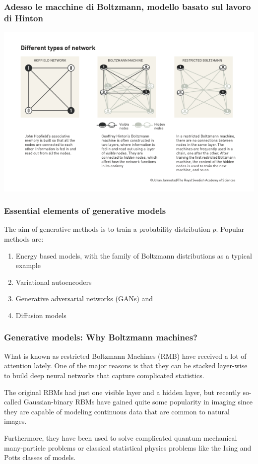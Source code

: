 \documentclass{beamer}
\begin{document}
\begin{frame}
\frametitle{Adesso le macchine di Boltzmann, modello basato sul lavoro di Hinton}

\vspace{6mm}

\centerline{\includegraphics[width=1.0\linewidth]{figures/boltzmannnobel.png}}

\vspace{6mm}
\end{frame}

\begin{frame}
\frametitle{Essential elements of generative models}

The aim of generative methods is to train a probability distribution $p$. Popular methods are:
\begin{enumerate}
\item Energy based models, with the family of Boltzmann distributions as a typical example

\item Variational autoencoders

\item Generative adversarial networks (GANs) and

\item Diffusion models
\end{enumerate}

\noindent
\end{frame}

\begin{frame}
\frametitle{Generative models: Why Boltzmann machines?}

What is known as restricted Boltzmann Machines (RMB) have received a
lot of attention lately.  One of the major reasons is that they can be
stacked layer-wise to build deep neural networks that capture
complicated statistics.

The original RBMs had just one visible layer and a hidden layer, but
recently so-called Gaussian-binary RBMs have gained quite some
popularity in imaging since they are capable of modeling continuous
data that are common to natural images.

Furthermore, they have been used to solve complicated quantum
mechanical many-particle problems or classical statistical physics
problems like the Ising and Potts classes of models.
\end{frame}
\end{document}
